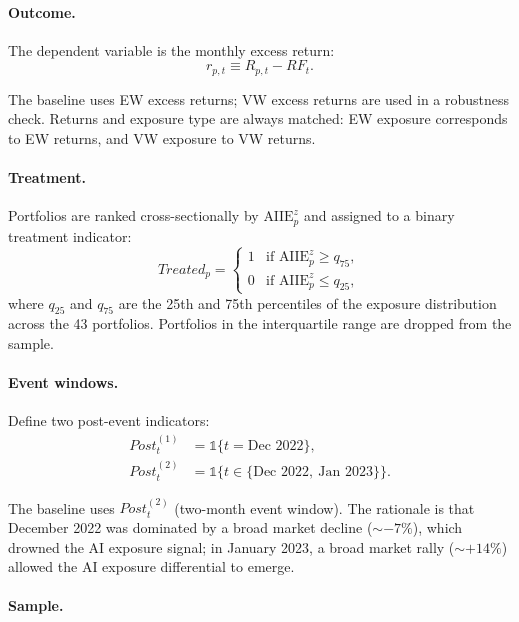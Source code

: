 \documentclass[11pt]{article}
\newcommand{\ind}{\mathbb{1}} %
\begin{document}
\paragraph{Outcome.}

The dependent variable is the monthly excess return:
\begin{equation}
  r_{p,t} \equiv R_{p,t} - RF_t.
\end{equation}

The baseline uses EW excess returns; VW excess returns are used in a robustness check. Returns and exposure type are always matched: EW exposure corresponds to EW returns, and VW exposure to VW returns.

\paragraph{Treatment.}

Portfolios are ranked cross-sectionally by $\text{AIIE}^z_p$ and assigned to a binary treatment indicator:
\begin{equation}
  Treated_p =
  \begin{cases}
    1 & \text{if } \text{AIIE}^z_p \geq q_{75}, \\
    0 & \text{if } \text{AIIE}^z_p \leq q_{25},
  \end{cases}
\end{equation}
where $q_{25}$ and $q_{75}$ are the 25th and 75th percentiles of the exposure distribution across the 43 portfolios. Portfolios in the interquartile range are dropped from the sample.

\paragraph{Event windows.}

Define two post-event indicators:
\begin{align}
  Post^{(1)}_t &= \ind\{t = \text{Dec 2022}\}, \\
  Post^{(2)}_t &= \ind\{t \in \{\text{Dec 2022},\ \text{Jan 2023}\}\}.
\end{align}

The baseline uses $Post^{(2)}_t$ (two-month event window). The rationale is that December 2022 was dominated by a broad market decline (${\sim}{-}7\%$), which drowned the AI exposure signal; in January 2023, a broad market rally (${\sim}{+}14\%$) allowed the AI exposure differential to emerge.

\paragraph{Sample.}
\end{document}
